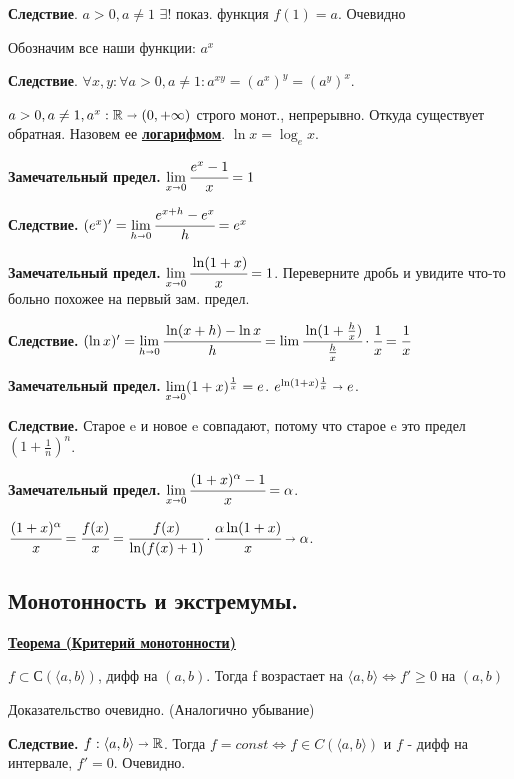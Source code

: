 \documentclass{article}
\newcommand{\deff}[1]{\underline{\textbf{#1}}}
\newcommand{\thmm}[1]{\underline{\textbf{#1}}}
\begin{document}
\textbf{Следствие}. $a>0, a\neq 1$ $\exists! $ показ. функция $f(1) = a$. Очевидно

Обозначим все наши функции: $a^x$

\textbf{Следствие}. $\forall x,y: \forall a>0, a \neq 1: a^{xy} = (a^x)^y  = (a^y)^x$. 

$a>0,a \neq 1, a^x: \mathbb{R} \shortrightarrow (0, +\infty)$ строго монот., непрерывно. Откуда существует обратная. Назовем ее \deff{логарифмом}. $\ln x = \log_e x$.

\textbf{Замечательный предел.} $\lim\limits_{x \shortrightarrow 0} \cfrac{e^x-1}{x}=1$

\textbf{Следствие.} $(e^x)' = \lim\limits_{h\shortrightarrow 0} \cfrac{e^{x+h}-e^x}{h}=e^x$

\textbf{Замечательный предел.} $\lim\limits_{x\shortrightarrow 0} \cfrac{\ln(1+x)}{x}=1 $. Переверните дробь и увидите что-то больно похожее на первый зам. предел.

\textbf{Следствие.} $(\ln x)' = \lim \limits_{h \shortrightarrow 0} \cfrac{\ln(x+h)-\ln x}{h} = \lim \cfrac{\ln(1+ \frac{h}{x})}{\frac{h}{x}}\cdot \cfrac{1}{x} = \cfrac{1}{x}$

\textbf{Замечательный предел.} $\lim\limits_{x\shortrightarrow 0} (1+x)^{\frac{1}{x}}=e$. $e^{\ln (1+x) \frac{1}{x}}\shortrightarrow e$.

\textbf{Следствие.}  Старое e и новое e совпадают, потому что старое e это предел $(1+\frac{1}{n})^n$.

\textbf{Замечательный предел.} $\lim\limits_{x\shortrightarrow 0} \cfrac{(1+x)^\alpha-1}{x} = \alpha$.

$\cfrac{(1+x)^\alpha}{x}=\cfrac{f(x)}{x}=\cfrac{f(x)}{\ln(f(x)+1)} \cdot \cfrac{\alpha \ln(1+x)}{x}\shortrightarrow \alpha$.
\pagebreak


\subsection{Монотонность и экстремумы.}

\thmm{Теорема (Критерий монотонности)}

$f \subset С(\langle a,b\rangle)$, дифф на $(a,b)$. Тогда f возрастает на $\langle a,b\rangle \Leftrightarrow f' \geq 0$ на $(a,b)$

Доказательство очевидно. (Аналогично убывание)

\textbf{Следствие.} $f: \langle a,b\rangle \shortrightarrow \mathbb{R}$.  Тогда $f = const \Leftrightarrow f \in C(\langle a,b \rangle)$ и $f$ - дифф на интервале, $f'=0$. Очевидно.
\end{document}

